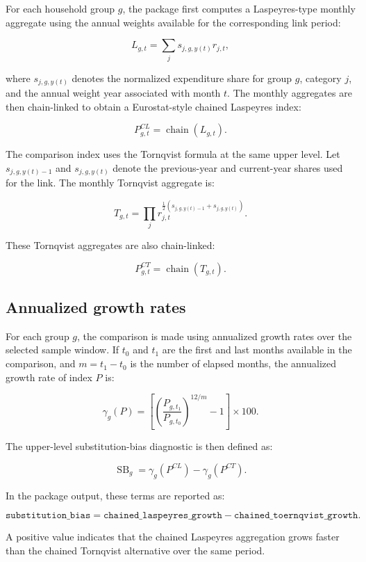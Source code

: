 For each household group \(g\), the package first computes a Laspeyres-type
monthly aggregate using the annual weights available for the corresponding
link period:

\[
L_{g,t}
= \sum_j s_{j,g,y(t)} r_{j,t},
\]

where \(s_{j,g,y(t)}\) denotes the normalized expenditure share for group
\(g\), category \(j\), and the annual weight year associated with month \(t\).
The monthly aggregates are then chain-linked to obtain a Eurostat-style
chained Laspeyres index:

\[
P^{CL}_{g,t}
= \operatorname{chain}\left(L_{g,t}\right).
\]

The comparison index uses the Tornqvist formula at the same upper level. Let
\(s_{j,g,y(t)-1}\) and \(s_{j,g,y(t)}\) denote the previous-year and current-year
shares used for the link. The monthly Tornqvist aggregate is:

\[
T_{g,t}
= \prod_j r_{j,t}^{\frac{1}{2}
\left(s_{j,g,y(t)-1} + s_{j,g,y(t)}\right)}.
\]

These Tornqvist aggregates are also chain-linked:

\[
P^{CT}_{g,t}
= \operatorname{chain}\left(T_{g,t}\right).
\]

\subsection{Annualized growth rates}

For each group \(g\), the comparison is made using annualized growth rates over
the selected sample window. If \(t_0\) and \(t_1\) are the first and last months
available in the comparison, and \(m=t_1-t_0\) is the number of elapsed months,
the annualized growth rate of index \(P\) is:

\[
\gamma_g(P)
= \left[
\left(\frac{P_{g,t_1}}{P_{g,t_0}}\right)^{12/m} - 1
\right] \times 100.
\]

The upper-level substitution-bias diagnostic is then defined as:

\[
\operatorname{SB}_g
= \gamma_g\left(P^{CL}\right)
- \gamma_g\left(P^{CT}\right).
\]

In the package output, these terms are reported as:

\[
\texttt{substitution\_bias}
= \texttt{chained\_laspeyres\_growth}
- \texttt{chained\_toernqvist\_growth}.
\]

A positive value indicates that the chained Laspeyres aggregation grows faster
than the chained Tornqvist alternative over the same period.

